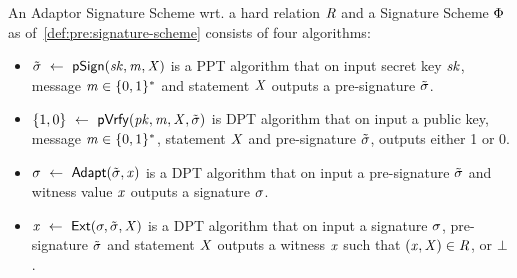 \begin{definition}\label{def:pre:script:apt}
    An Adaptor Signature Scheme wrt. a hard relation $\mathit{R}$ and a Signature Scheme $\Phi$ as of~\cref{def:pre:signature-scheme} consists of four algorithms:
    \begin{itemize}
        \item $\tilde{\sigma} ~\leftarrow~ \mathsf{pSign}(\mathit{sk}, \mathit{m}, \mathit{X})$ is a PPT algorithm that on input secret key $\mathit{sk}$, message $\mathit{m} \in \{0,1\}^{*}$ and statement $\mathit{X}$ outputs a pre-signature $\tilde{\sigma}$.
        \item $\{1,0\} ~\leftarrow~ \mathsf{pVrfy}(\mathit{pk}, \mathit{m}, \mathit{X}, \tilde{\sigma})$ is DPT algorithm that on input a public key, message $\mathit{m} \in \{0,1\}^{*}$, statement $\mathit{X}$ and pre-signature $\tilde{\sigma}$, outputs either 1 or 0.
        \item $\sigma ~\leftarrow~ \mathsf{Adapt}(\tilde{\sigma}, \mathit{x})$ is a DPT algorithm that on input a pre-signature $\tilde{\sigma}$ and witness value $\mathit{x}$ outputs a signature $\sigma$.
        \item $\mathit{x} ~\leftarrow~ \mathsf{Ext}(\sigma, \tilde{\sigma}, \mathit{X})$ is a DPT algorithm that on input a signature $\sigma$, pre-signature $\tilde{\sigma}$ and statement $\mathit{X}$ outputs a witness $\mathit{x}$ such that $(\mathit{x}, \mathit{X}) \in \mathit{R}$, or $\bot$.
    \end{itemize}
\end{definition}
